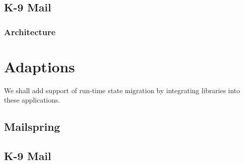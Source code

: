 \subsection{K-9 Mail}
\subsubsection{Architecture}

\section{Adaptions}
We shall add support of run-time state migration by integrating libraries into these applications.
\subsection{Mailspring}
\subsection{K-9 Mail}
